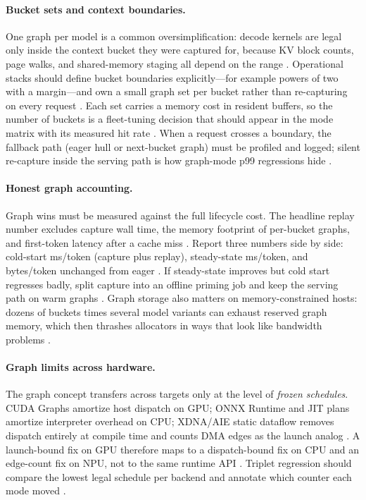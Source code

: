 \paragraph{Bucket sets and context boundaries.}
One graph per model is a common oversimplification: decode kernels are legal only inside the context bucket they were captured for, because KV block counts, page walks, and shared-memory staging all depend on the range \citep{kwon2023vllm,memoryfloor2026}. Operational stacks should define bucket boundaries explicitly---for example powers of two with a margin---and own a small graph set per bucket rather than re-capturing on every request \citep{patel2025llminference,taxbreak2026}. Each set carries a memory cost in resident buffers, so the number of buckets is a fleet-tuning decision that should appear in the mode matrix with its measured hit rate \citep{nvidia2024cudagraphs,yirage2026}. When a request crosses a boundary, the fallback path (eager hull or next-bucket graph) must be profiled and logged; silent re-capture inside the serving path is how graph-mode p99 regressions hide \citep{memoryfloor2026,chen2020compilerbasedhardw}.

\paragraph{Honest graph accounting.}
Graph wins must be measured against the full lifecycle cost. The headline replay number excludes capture wall time, the memory footprint of per-bucket graphs, and first-token latency after a cache miss \citep{nvidia2024cudagraphs,memoryfloor2026}. Report three numbers side by side: cold-start ms/token (capture plus replay), steady-state ms/token, and bytes/token unchanged from eager \citep{taxbreak2026,patel2025llminference}. If steady-state improves but cold start regresses badly, split capture into an offline priming job and keep the serving path on warm graphs \citep{kwon2023vllm,yirage2026}. Graph storage also matters on memory-constrained hosts: dozens of buckets times several model variants can exhaust reserved graph memory, which then thrashes allocators in ways that look like bandwidth problems \citep{memoryfloor2026,chen2020compilerbasedhardw}.

\paragraph{Graph limits across hardware.}
The graph concept transfers across targets only at the level of \emph{frozen schedules}. CUDA Graphs amortize host dispatch on GPU; ONNX Runtime and JIT plans amortize interpreter overhead on CPU; XDNA/AIE static dataflow removes dispatch entirely at compile time and counts DMA edges as the launch analog \citep{dlbook,amd2024xdna,chen2020compilerbasedhardw}. A launch-bound fix on GPU therefore maps to a dispatch-bound fix on CPU and an edge-count fix on NPU, not to the same runtime API \citep{amd2024aie,patel2025llminference}. Triplet regression should compare the lowest legal schedule per backend and annotate which counter each mode moved \citep{taxbreak2026,memoryfloor2026,yirage2026}.

